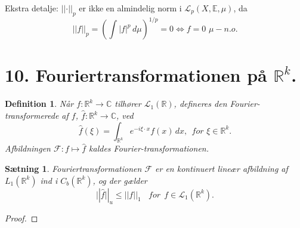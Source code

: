 \documentclass[12pt]{report}
\newtheorem{theorem}[lemma]{Sætning}
\newtheorem{definition}[lemma]{Definition}
\theoremstyle{break}
\newtheorem*{proof}{Bevis}
\theoremstyle{break}
\newcommand{\Int}[1]{\int#1\,d\mu}
\newcommand{\RR}{\mathbb{R}}
\newcommand{\EE}{\mathbb{E}}
\newcommand{\FI}{\mathcal{F}}
\renewcommand{\L}{\mathcal{L}}
\newcommand{\laengde}[1]{\lvert|#1\rvert|}
\newcommand{\1}{\mathds{1}}
\begin{document}
\bigskip

Ekstra detalje: $\laengde{\cdot}_p$ er ikke en almindelig norm i $\L_p(X,\EE,\mu)$, da
\[\laengde{f}_p=\left(\Int{|f|^p}\right)^{1/p} = 0\Leftrightarrow f=0\,\,\mu-n.o.\]


\newpage
\section*{10. Fouriertransformationen på $\RR^k$.}
\begin{definition}
Når $f\colon\RR^k\to\mathbb{C}$ tilhører $\L_1(\RR)$, defineres den Fourier-transformerede af $f$, $\hat{f}\colon\RR^k\to\mathbb{C}$, ved 
\[\hat{f}(\xi) = \int_{\RR^k}e^{-i\xi\cdot x}f(x)\,dx,~~for\,\,\xi\in\RR^k.\]
Afbildningen $\FI\colon f\mapsto\hat{f}$ kaldes Fourier-transformationen.
\end{definition}
\begin{theorem}
Fouriertransformationen $\FI$ er en kontinuert lineær afbildning af $L_1(\RR^k)$ ind i $C_b(\RR^k)$, og der gælder
\[\laengde{\hat{f}}_u\leq\laengde{f}_1~~~~for~~f\in\L_1(\RR^k).\]
\end{theorem}
\begin{proof}

\end{proof}
\end{document}
